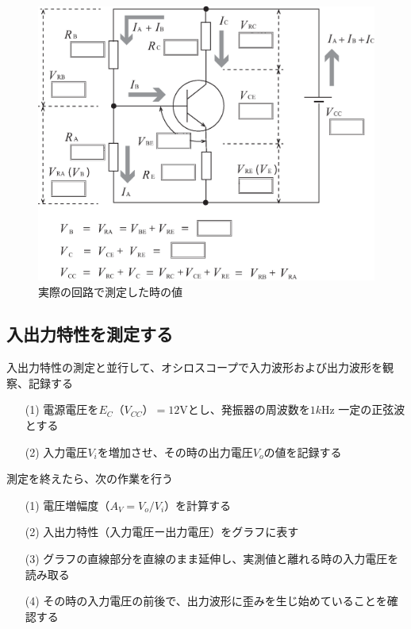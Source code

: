 \documentclass[uplatex,a4paper,11pt,oneside,openany]{jsbook}
\begin{document}
\begin{figure}[H]
  \centering
   \includegraphics[keepaspectratio, scale=0.56, angle=0]
               {figs/eps/p96fig3b.eps}
               \caption{実際の回路で測定した時の値}
               \label{fig:11_1}
\end{figure}

\newpage

\subsection{入出力特性を測定する}

入出力特性の測定と並行して、オシロスコープで入力波形および出力波形を観察、記録する

\begin{enumerate}
\item[(1)] 電源電圧を$E_C（V_{CC}）=12$Vとし、発振器の周波数を$1k$Hz 一定の正弦波とする
\item[(2)] 入力電圧$V_i$を増加させ、その時の出力電圧$V_o$の値を記録する
\end{enumerate}

測定を終えたら、次の作業を行う

\begin{enumerate}
\item[(1)] 電圧増幅度（$A_V=V_o/V_i$）を計算する
\item[(2)] 入出力特性（入力電圧ー出力電圧）をグラフに表す 
\item[(3)] グラフの直線部分を直線のまま延伸し、実測値と離れる時の入力電圧を読み取る
\item[(4)] その時の入力電圧の前後で、出力波形に歪みを生じ始めていることを確認する
\end{enumerate}
\end{document}
